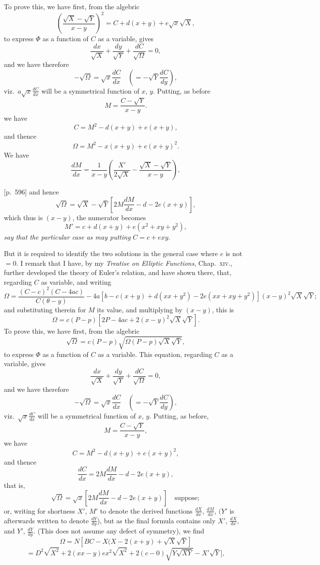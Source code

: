 \documentclass[11pt,a4paper]{article}
\theoremstyle{plain}
\theoremstyle{definition}
\theoremstyle{remark}
\begin{document}
To prove this, we have first, from the algebric
\[
\left( \frac{\sqrt{X} - \sqrt{Y}}{x - y} \right)^2 = C + d(x + y) + e\sqrt{x}\sqrt{X},
\]
to express $\Phi$ as a function of $C$ as a variable, gives
\[
\frac{dx}{\sqrt{X}} + \frac{dy}{\sqrt{Y}} + \frac{dC}{\sqrt{\Omega}} = 0,
\]
and we have therefore
\[
-\sqrt{\Omega} = \sqrt{x} \frac{dC}{dx} \quad (= -\sqrt{Y} \frac{dC}{dy}),
\]
viz.\ $a\sqrt{x} \frac{dC}{dx}$ will be a symmetrical function of $x$, $y$. Putting, as before
\[
M = \frac{C - \sqrt{Y}}{x - y}.
\]
we have
\[
C = M^2 - d(x + y) + e(x + y),
\]
and thence
\[
\Omega = M^2 - x(x + y) + e(x + y)^2.
\]
We have
\[
\frac{dM}{dx} = \frac{1}{x - y} \left( \frac{X'}{2\sqrt{X}} - \frac{\sqrt{X} - \sqrt{Y}}{x - y} \right),
\]

\bigskip

[p.~596] and hence
\[
\sqrt{\Omega} = \sqrt{X} - \sqrt{Y} \left[ 2M \frac{dM}{dx} - d - 2e(x + y) \right],
\]
which thus is $(x - y)$, the numerator becomes
\[
M' = c + d(x + y) + e(x^2 + xy + y^2),
\]
\textit{say that the particular case as may putting} $C = c + e xy$.

But it is required to identify the two solutions in the general case where $e$ is not $= 0$. I remark that I have, by my \textit{Treatise on Elliptic Functions}, Chap.\ \textsc{xiv}., further developed the theory of Euler's relation, and have shown there, that, regarding $C$ as variable, and writing
\[
\Omega = \frac{(C - c)^2(C - 4ac)}{C(\theta - y)} - 4a \left[ b - c(x + y) + d(x x + y^2) - 2e(x x + x y + y^2) \right] (x - y)^2 \sqrt{X} \sqrt{Y};
\]
and substituting therein for $M$ its value, and multiplying by $(x - y)$, this is
\[
\Omega = c(P - p) [ 2 P - 4ac + 2(x - y)^2 \sqrt{X}\sqrt{Y}].
\]
To prove this, we have first, from the algebric
\[
\sqrt{\Omega} = c(P - p) \sqrt{ \Omega(P - p) \sqrt{X} \sqrt{Y} },
\]
to express $\Phi$ as a function of $C$ as a variable. This equation, regarding $C$ as a variable, gives
\[
\frac{dx}{\sqrt{X}} + \frac{dy}{\sqrt{Y}} + \frac{dC}{\sqrt{\Omega}} = 0,
\]
and we have therefore
\[
-\sqrt{\Omega} = \sqrt{x} \frac{dC}{dx} \quad (= -\sqrt{Y} \frac{dC}{dy}),
\]
viz.\ $\sqrt{x}\frac{dC}{dx}$ will be a symmetrical function of $x$, $y$. Putting, as before,
\[
M = \frac{C - \sqrt{Y}}{x - y},
\]
we have
\[
C = M^2 - d(x + y) + e(x + y)^2,
\]
and thence
\[
\frac{dC}{dx} = 2M \frac{dM}{dx} - d - 2e(x + y),
\]
that is,
\[
\sqrt{\Omega} = \sqrt{x} \left[ 2M \frac{dM}{dx} - d - 2e(x + y) \right] \quad \text{suppose};
\]
or, writing for shortness $X'$, $M'$ to denote the derived functions $\frac{dX}{dx}$, $\frac{dM}{dx}$, $(Y'$ is afterwards written to denote $\frac{dY}{dy}$), but as the final formula contains only $X'$, $\frac{dX}{dx}$, and $Y'$, $\frac{dY}{dy}$. (This does not assume any defect of symmetry), we find
\[
\Omega = N \left[ BC - X(X - 2(x + y) + \sqrt{X} \sqrt{Y} \right]
\]
\[
= D^2 \sqrt{X^2} + 2(xx - y)e x^2 \sqrt{X^2} + 2(c - 0)\sqrt{Y \sqrt{XY}} - X'\sqrt{Y}],
\]
\end{document}

